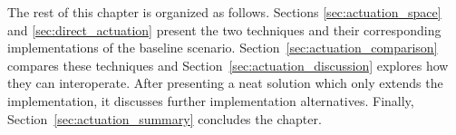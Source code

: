 \bigskip

The rest of this chapter is organized as follows.
Sections \ref{sec:actuation_space} and \ref{sec:direct_actuation} present the two techniques and their corresponding implementations of the baseline scenario. %
Section~\ref{sec:actuation_comparison} compares these techniques and Section~\ref{sec:actuation_discussion} explores how they can interoperate. %
After presenting a neat solution which only extends the \Space{} implementation, it discusses further implementation alternatives.
Finally, Section~\ref{sec:actuation_summary} concludes the chapter.







%

